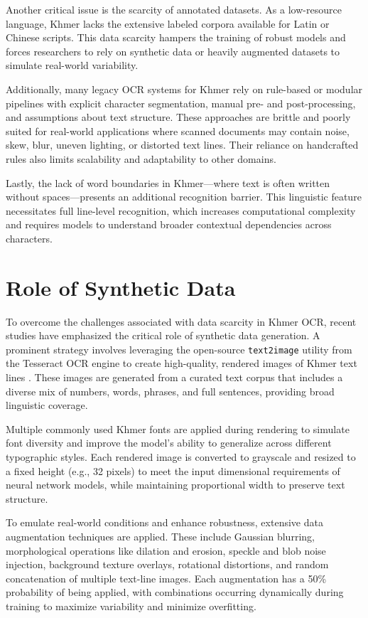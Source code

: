Another critical issue is the scarcity of annotated datasets. As a low-resource language, Khmer lacks 
the extensive labeled corpora available for Latin or Chinese scripts. This data scarcity hampers the 
training of robust models and forces researchers to rely on synthetic data or heavily augmented datasets 
to simulate real-world variability.

Additionally, many legacy OCR systems for Khmer rely on rule-based or modular pipelines with explicit 
character segmentation, manual pre- and post-processing, and assumptions about text structure. These 
approaches are brittle and poorly suited for real-world applications where scanned documents may contain 
noise, skew, blur, uneven lighting, or distorted text lines. Their reliance on handcrafted rules also 
limits scalability and adaptability to other domains.

Lastly, the lack of word boundaries in Khmer—where text is often written without spaces—presents an 
additional recognition barrier. This linguistic feature necessitates full line-level recognition, 
which increases computational complexity and requires models to understand broader contextual dependencies 
across characters.



\section{Role of Synthetic Data}
\label{sec:dl-models}

To overcome the challenges associated with data scarcity in Khmer OCR, 
recent studies have emphasized the critical role of synthetic data generation. A prominent 
strategy involves leveraging the open-source \texttt{text2image} utility from the Tesseract OCR 
engine to create high-quality, rendered images of Khmer text lines \citep{buoy2021seq2seq}. 
These images are generated from a curated text corpus that includes a diverse mix of numbers, 
words, phrases, and full sentences, providing broad linguistic coverage.

Multiple commonly used Khmer fonts are applied during rendering to simulate font diversity and 
improve the model's ability to generalize across different typographic styles. Each rendered 
image is converted to grayscale and resized to a fixed height (e.g., 32 pixels) to meet the input 
dimensional requirements of neural network models, while maintaining proportional width to preserve 
text structure.

To emulate real-world conditions and enhance robustness, extensive data augmentation techniques 
are applied. These include Gaussian blurring, morphological operations like dilation and erosion, 
speckle and blob noise injection, background texture overlays, rotational distortions, and random 
concatenation of multiple text-line images. Each augmentation has a 50\% probability of being applied, 
with combinations occurring dynamically during training to maximize variability and minimize overfitting.

